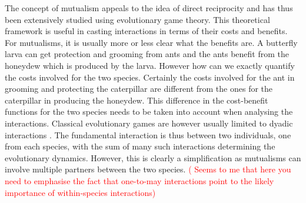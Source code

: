 \documentclass[12pt]{article}
\newcommand{\paul}[1]{\textcolor{red}{(#1)}}
\begin{document}
The concept of mutualism appeals to the idea of direct reciprocity \citep{trivers:QRB:1971} and has thus been extensively studied using evolutionary game theory.
This theoretical framework is useful in casting interactions in terms of their costs and benefits.
For mutualisms, it is usually more or less clear what the benefits are.
A butterfly larva can get protection and grooming from ants and the ants benefit from the honeydew which is produced by the larva.
However how can we exactly quantify the costs involved for the two species.
Certainly the costs involved for the ant in grooming and protecting the caterpillar are different from the ones for the caterpillar in producing the honeydew.
This difference in the cost-benefit functions for the two species needs to be taken into account when analysing the interactions.
Classical evolutionary games are however usually limited to dyadic interactions \citep{weibull:book:1995,hofbauer:JMB:1996,hofbauer:book:1998}.
The fundamental interaction is thus between two individuals, one from each species, with the sum of many such interactions determining the evolutionary dynamics.
However, this is clearly a simplification \citep{noe:TREE:1995,noe:book:2001,kiers:Nature:2003,stanton:AmNat:2003,stadler:book:2008,kiers:Science:2011} as mutualisms can involve multiple partners between the two species.  
\paul{ Seems to me that here you need to emphasise the fact that one-to-may interactions point to the likely importance of within-species interactions}
\end{document}

